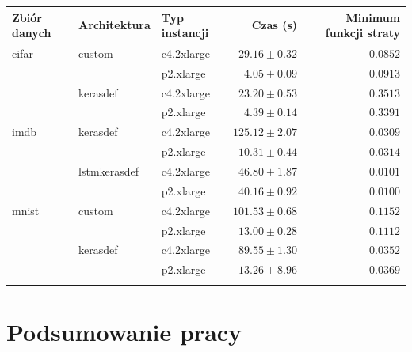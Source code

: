 \documentclass[12pt,a4paper,twoside]{article}
\begin{document}
\begin{tabular}{lllrr}
\toprule
Zbiór danych & Architektura & Typ instancji & Czas (s) & Minimum funkcji straty \\
\midrule
cifar & custom & c4.2xlarge & $29.16\pm0.32$ & $0.0852$ \\
      & & p2.xlarge & $4.05\pm0.09$ & $0.0913$ \\
\midrule
      & kerasdef & c4.2xlarge & $23.20\pm0.53$ & $0.3513$ \\
      & & p2.xlarge & $4.39\pm0.14$ & $0.3391$ \\
\midrule
imdb & kerasdef & c4.2xlarge & $125.12\pm2.07$ & $0.0309$ \\
      & & p2.xlarge & $10.31\pm0.44$ & $0.0314$ \\
\midrule
      & lstmkerasdef & c4.2xlarge & $46.80\pm1.87$ & $0.0101$ \\
      & & p2.xlarge & $40.16\pm0.92$ & $0.0100$ \\
\midrule
mnist & custom & c4.2xlarge & $101.53\pm0.68$ & $0.1152$ \\
      & & p2.xlarge & $13.00\pm0.28$ & $0.1112$ \\
\midrule
      & kerasdef & c4.2xlarge & $89.55\pm1.30$ & $0.0352$ \\
      & & p2.xlarge & $13.26\pm8.96$ & $0.0369$ \\
\bottomrule
\label{tab:experiment_results}
\end{tabular}

\clearpage

\section{Podsumowanie pracy}

\clearpage
\end{document}
